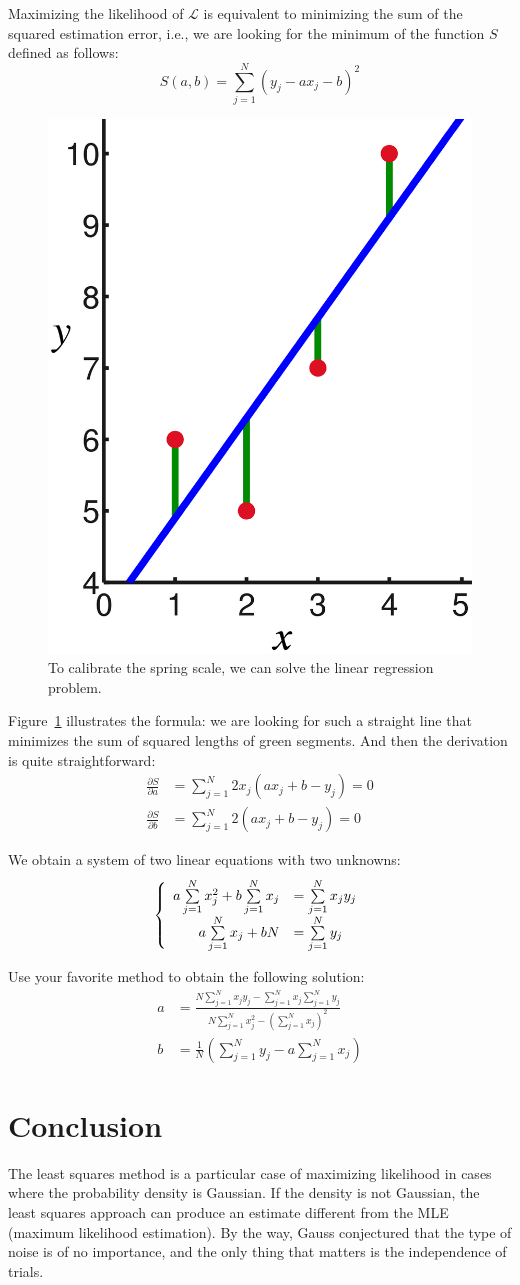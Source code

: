\documentclass[notitlepage]{report}
\begin{document}
Maximizing the likelihood of $\mathcal L$ is equivalent to minimizing the sum of the squared estimation error, i.e., we are looking for the minimum of the function $S$ defined as follows:
$$
S(a, b) = \sum\limits_{j=1}^N (y_j- a x_j - b)^2
$$


\begin{figure}[htb!]
\centering
\includegraphics[width=.2\columnwidth]{c5aa80f6a2e9575abfa7b3dfdabf5c5a.png}
\caption{To calibrate the spring scale, we can solve the linear regression problem.}
\label{fig:regression}
\end{figure}

Figure~\ref{fig:regression} illustrates the formula: we are looking for such a straight line that minimizes the sum of squared lengths of green segments.
And then the derivation is quite straightforward:
\begin{align*}
\frac{\partial S}{\partial a} &= \sum\limits_{j=1}^N 2 x_j (a x_j + b - y_j) = 0 \\
\frac{\partial S}{\partial b} &= \sum\limits_{j=1}^N 2 (a x_j + b - y_j) = 0
\end{align*}

We obtain a system of two linear equations with two unknowns:
$$
\left \{ \begin{array}{r l}
a \sum\limits_{j=1}^N x_j^2 + b \sum\limits_{j=1}^N x_j  & = \sum\limits_{j=1}^N x_j y_j\\
a \sum\limits_{j=1}^N x_j   + b N                        & = \sum\limits_{j=1}^N y_j
\end{array} \right.
$$

Use your favorite method to obtain the following solution:
\begin{align*}
a &= \frac{N \sum\limits_{j=1}^N x_j y_j - \sum\limits_{j=1}^N x_j \sum\limits_{j=1}^N y_j}{N\sum\limits_{j=1}^N x_j^2 - \left(\sum\limits_{j=1}^N x_j\right)^2} \\
b &= \frac{1}{N}\left(  \sum\limits_{j=1}^N y_j - a  \sum\limits_{j=1}^N x_j \right)
\end{align*}

\section*{Conclusion}
The least squares method is a particular case of maximizing likelihood in cases where the probability density is Gaussian.
If the density is not Gaussian, the least squares approach can produce an estimate different from the MLE (maximum likelihood estimation).
By the way, Gauss conjectured that the type of noise is of no importance, and the only thing that matters is the independence of trials.
\end{document}

